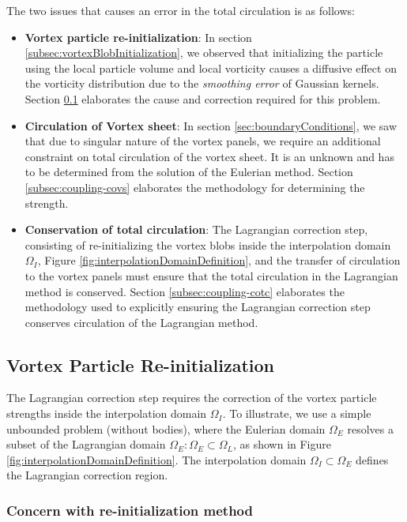 The two issues that causes an error in the total circulation is as follows:
	\begin{itemize}
	\item \textbf{Vortex particle re-initialization}: In section \ref{subsec:vortexBlobInitialization}, we observed that initializing the particle using the local particle volume and local vorticity causes a diffusive effect on the vorticity distribution due to the \textit{smoothing error} of Gaussian kernels. Section 	\ref{subsec:coupling-vpri} elaborates the cause and correction required for this problem.
	
	\item \textbf{Circulation of Vortex sheet}: In section \ref{sec:boundaryConditions}, we saw that due to singular nature of the vortex panels, we require an additional constraint on total circulation of the vortex sheet. It is an unknown and has to be determined from the solution of the Eulerian method. Section \ref{subsec:coupling-covs} elaborates the methodology for determining the strength.
	\item \textbf{Conservation of total circulation}: The Lagrangian correction step, consisting of re-initializing the vortex blobs inside the interpolation domain $\Omega_I$, Figure \ref{fig:interpolationDomainDefinition}, and the transfer of circulation to the vortex panels must ensure that the total circulation in the Lagrangian method is conserved. Section \ref{subsec:coupling-cotc} elaborates the methodology used to explicitly ensuring the Lagrangian correction step conserves circulation of the Lagrangian method.
	\end{itemize}

	\subsection{Vortex Particle Re-initialization}
	\label{subsec:coupling-vpri}
	The Lagrangian correction step requires the correction of the vortex particle strengths inside the interpolation domain $\Omega_{I}$. To illustrate, we use a simple unbounded problem (without bodies), where the Eulerian domain $\Omega_E$ resolves a subset of the Lagrangian domain $\Omega_E:\Omega_E\subset\Omega_L$, as shown in Figure \ref{fig:interpolationDomainDefinition}. The interpolation domain $\Omega_I\subset\Omega_E$ defines the Lagrangian correction region.
	
	\subsubsection*{Concern with re-initialization method}

